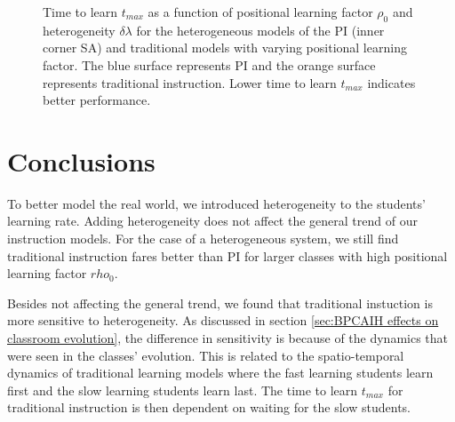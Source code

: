 \begin{figure}[htbp!]
   \caption[3D plots for the dependence of time to learn $t_{max}$ on both the positional learning factor $\rho_0$ and heterogeneity $\delta\lambda$]{Time to learn $t_{max}$ as a function of positional learning factor $\rho_0$ and heterogeneity $\delta\lambda$ for the heterogeneous models of the PI (inner corner SA) and traditional models with varying positional learning factor. 
   The blue surface represents PI and the orange surface represents traditional instruction.
   Lower time to learn $t_{max}$ indicates better performance.
   }
   \label{fig:2DBPCAIH rho-dl-t plots}
\end{figure}

\newpage %

\section{Conclusions}\label{sec:BPCAIH discussions}
To better model the real world, we introduced heterogeneity to the students' learning rate. 
Adding heterogeneity does not affect the general trend of our instruction models. 
For the case of a heterogeneous system, we still find traditional instruction fares better than PI for larger classes with high positional learning factor $rho_0$.

Besides not affecting the general trend, we found that traditional instuction is more sensitive to heterogeneity. 
As discussed in section \ref{sec:BPCAIH effects on classroom evolution}, the difference in sensitivity is because of the dynamics that were seen in the classes' evolution. 
This is related to the spatio-temporal dynamics of traditional learning models where the fast learning students learn first and the slow learning students learn last.
The time to learn $t_{max}$ for traditional instruction is then dependent on waiting for the slow students.

